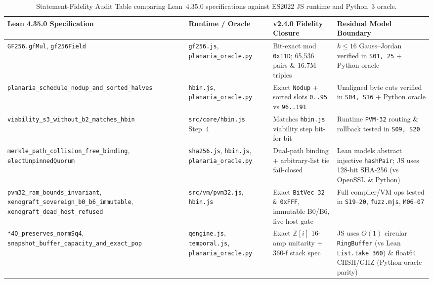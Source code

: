 \documentclass[11pt,letterpaper]{article}
\theoremstyle{remark}
\begin{document}
\begin{table}[ht]
\centering
\caption{Statement-Fidelity Audit Table comparing Lean~4.35.0 specifications against ES2022 JS runtime and Python~3 oracle.}
\label{tab:fidelity}
\footnotesize
\setlength{\tabcolsep}{4pt}
\begin{tabular}{@{} >{\raggedright\arraybackslash}p{4.0cm} >{\raggedright\arraybackslash}p{3.1cm} >{\raggedright\arraybackslash}p{4.6cm} >{\raggedright\arraybackslash}p{3.4cm} @{}}
\toprule
\textbf{Lean 4.35.0 Specification} & \textbf{Runtime / Oracle} & \textbf{v2.4.0 Fidelity Closure} & \textbf{Residual Model Boundary} \\
\midrule
\texttt{GF256.gfMul}, \texttt{gf256Field} & \texttt{gf256.js}, \nolinkurl{planaria_oracle.py} & Bit-exact mod \texttt{0x11D}; 65,536 pairs \& 16.7M triples & $k\le 16$ Gauss--Jordan verified in \texttt{S01, 25} + Python oracle \\
\texttt{planaria\_\allowbreak schedule\_\allowbreak nodup\_\allowbreak and\_\allowbreak sorted\_\allowbreak halves} & \texttt{hbin.js}, \nolinkurl{planaria_oracle.py} & Exact \texttt{Nodup} + sorted slots \texttt{0..95} vs \texttt{96..191} & Unaligned byte cuts verified in \texttt{S04, S16} + Python oracle \\
\texttt{viability\_\allowbreak s3\_\allowbreak without\_\allowbreak b2\_\allowbreak matches\_\allowbreak hbin} & \texttt{src/core/hbin.js} Step~4 & Matches \texttt{hbin.js} viability step bit-for-bit & Runtime \texttt{PVM-32} routing \& rollback tested in \texttt{S09, S20} \\
\texttt{merkle\_\allowbreak path\_\allowbreak collision\_\allowbreak free\_\allowbreak binding}, \texttt{electUnpinnedQuorum} & \texttt{sha256.js}, \texttt{hbin.js}, \nolinkurl{planaria_oracle.py} & Dual-path binding + arbitrary-list tie fail-closed & Lean models abstract injective \texttt{hashPair}; JS uses 128-bit SHA-256 (vs OpenSSL \& Python) \\
\texttt{pvm32\_\allowbreak ram\_\allowbreak bounds\_\allowbreak invariant}, \texttt{xenograft\_\allowbreak sovereign\_\allowbreak b0\_\allowbreak b6\_\allowbreak immutable}, \texttt{xenograft\_\allowbreak dead\_\allowbreak host\_\allowbreak refused} & \texttt{src/vm/pvm32.js}, \texttt{hbin.js} & Exact \texttt{BitVec 32} \texttt{\& 0xFFF}, immutable B0/B6, live-host gate & Full compiler/VM ops tested in \texttt{S19}--\texttt{20}, \texttt{fuzz.mjs}, \texttt{M06}--\texttt{07} \\
\texttt{*4Q\_\allowbreak preserves\_\allowbreak normSq4}, \texttt{snapshot\_\allowbreak buffer\_\allowbreak capacity\_\allowbreak and\_\allowbreak exact\_\allowbreak pop} & \texttt{qengine.js}, \texttt{temporal.js}, \nolinkurl{planaria_oracle.py} & Exact $\mathbb{Z}[i]$ 16-amp unitarity + 360-f stack spec & JS uses $O(1)$ circular \texttt{RingBuffer} (vs Lean \texttt{List.take 360}) \& float64 CHSH/GHZ (Python oracle parity) \\
\bottomrule
\end{tabular}
\end{table}
\end{document}
